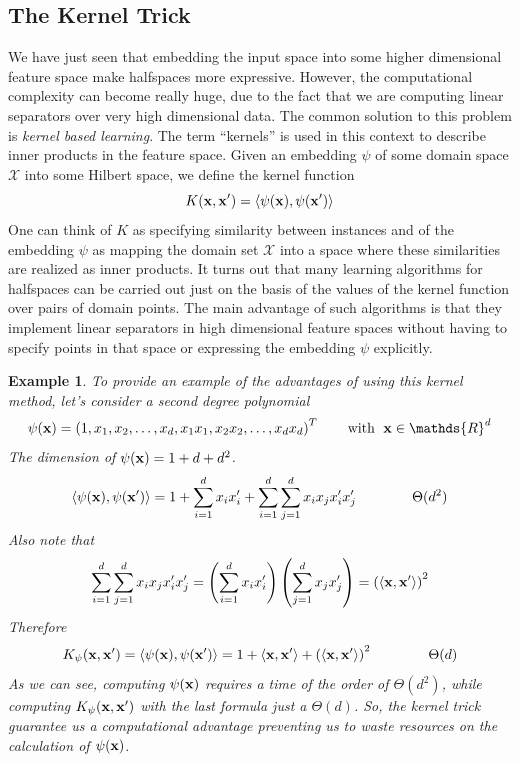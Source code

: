 \documentclass[12pt]{report}
\theoremstyle{plain}
\newtheorem{example}{Example}[chapter]
\newcommand\mcl[1]{\mathcal{#1}}
\newcommand\sprod[2]{\langle \vb{#1},\vb{#2}\rangle}
\begin{document}
\begin{flushleft}
\section{The Kernel Trick}
We have just seen that embedding the input space into some higher dimensional feature space make halfspaces more expressive. However, the computational complexity can become really huge, due to the fact that we are computing linear separators over very high dimensional data. The common solution to this problem is \textit{kernel based learning}. The term “kernels” is used in this context to describe inner products in the feature space. Given an embedding $\psi$ of some domain space $\mcl{X}$ into some Hilbert space, we define the kernel function 
\[ K(\vb{x},\vb{x}')=\sprod{\psi(x)}{\psi(x')} \]
One can think of $K$ as specifying similarity between instances and of the embedding $\psi$ as mapping the domain set $\mcl{X}$ into a space where these similarities are realized as inner products. It turns out that many learning algorithms for halfspaces can be carried out just on the basis of the values of the kernel function over pairs of domain points. The main advantage of such algorithms is that they implement linear separators in high dimensional feature spaces without having to specify points in that space or expressing the embedding $\psi$ explicitly.\\
\begin{example}
	To provide an example of the advantages of using this kernel method, let's consider a second degree polynomial
	\[ \psi(\vb{x})=\left(1,x_1,x_2,\dots,x_d,x_1x_1,x_2x_2,\dots,x_dx_d\right)^T \qquad \text{with }\; \vb{x}\in\mathds{R}^d \]
	The dimension of $\psi(\vb{x})=1+d+d^2$.
	\[ \sprod{\psi(\vb{x})}{\psi(\vb{x}')} = 1+\sum_{i=1}^dx_ix_i'+\sum_{i=1}^d\sum_{j=1}^dx_ix_jx_i'x_j' \qquad\qquad\Theta(d^2) \]
	Also note that
	\[ \sum_{i=1}^d\sum_{j=1}^dx_ix_jx_i'x_j'= \left(\sum_{i=1}^dx_ix_i'\right)\left(\sum_{j=1}^dx_jx_j'\right)=\left(\sprod{x}{x'}\right)^2 \]
	Therefore
	\[  K_\psi(\vb{x},\vb{x}') = \sprod{\psi(\vb{x})}{\psi(\vb{x}')} = 1+\sprod{x}{x'}+\left(\sprod{x}{x'}\right)^2\qquad\qquad\Theta(d) \]
	As we can see, computing $\psi(\vb{x})$ requires a time of the order of $\Theta(d^2)$, while computing $K_\psi(\vb{x},\vb{x}')$ with the last formula just a $\Theta(d)$. So, the kernel trick guarantee us a computational advantage preventing us to waste resources on the calculation of $\psi(\vb{x})$.
\end{example}


\end{flushleft}
\end{document}
